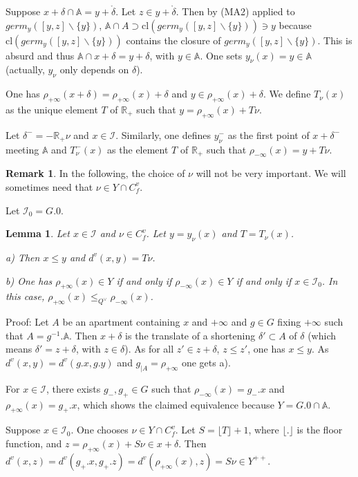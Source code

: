 \documentclass[12pt]{article}
\theoremstyle{plain}
\newtheorem{lemme}[thm]{Lemma}
\theoremstyle{definition}
\newtheorem{rque}[thm]{Remark}
\newcommand{\R}{\mathbb{R}}
\newcommand{\A}{\mathbb{A}}
\newcommand{\I}{\mathcal{I}}
\begin{document}
 Suppose $x+\delta\cap \A=y+\mathring{\delta}$. Let $z\in y+\mathring{\delta}$. Then by (MA2) applied to $germ_y([y,z]\backslash\{y\})$, $\A\cap A\supset \mathrm{cl}(germ_y([y,z]\backslash\{y\}))\ni y$ because $\mathrm{cl}(germ_y([y,z]\backslash\{y\}))$ contains the closure of $germ_y([y,z]\backslash\{y\})$. This is absurd and thus $\A\cap x+\delta=y+\delta$, with $y\in \A$. One sets $y_\nu(x)=y\in\A$ (actually, $y_\nu$ only depends on $\delta$).

One has $\rho_{+\infty}(x+\delta)=\rho_{+\infty}(x)+\delta$ and $y\in \rho_{+\infty}(x)+\delta$. We define $T_\nu(x)$ as the unique element $T$ of $\mathbb{R}_+$ such that $y=\rho_{+\infty}(x)+T\nu$.

Let $\delta^-=-\R_+\nu$ and $x\in \I$. Similarly, one defines $y_\nu^-$ as the first point of $x+\delta^-$ meeting $\A$ and $T^-_\nu(x)$ as the element $T$ of $\R_+$ such that $\rho_{-\infty}(x)=y+T\nu$.


\begin{rque}
In the following, the choice of $\nu$ will not be very important. We will sometimes need that $\nu\in Y\cap C_f^v$.
\end{rque}

Let $\I_0=G.0$.


\begin{lemme}\label{lemme distance vectorielle}
Let $x\in \mathcal{I}$ and $\nu\in C_f^v$. Let $y=y_\nu(x)$ and $T=T_\nu(x)$.

a)  Then $x\leq y$ and $d^v(x,y)=T\nu$.

b) One has $\rho_{+\infty}(x)\in Y$ if and only if $\rho_{-\infty}(x)\in Y$ if and only if $x\in \mathcal I_0$. In this case, $\rho_{+\infty}(x)\leq_{Q^\vee} \rho_{-\infty}(x)$.


\end{lemme}

Proof: Let $A$ be an apartment containing $x$ and $+\infty$ and $g\in G$ fixing $+\infty$ such that $A=g^{-1}.\A$. Then $x+\delta$ is the translate of a shortening $\delta'\subset A$ of $\delta$ (which means $\delta'=z+\delta$, with $z\in \delta$). As for all $z'\in z+\delta$, $z\leq z'$, one has $x\leq y$. As $d^v(x,y)=d^v(g.x,g.y)$ and $g_{|A}=\rho_{+\infty}$ one gets a).

For $x\in\mathcal{I}$, there exists $g_-,g_+\in G$ such that $\rho_{-\infty}(x)=g_-.x$ and $\rho_{+\infty}(x)=g_+.x$, which shows the claimed equivalence because $Y=G.0\cap \mathbb{A}$.

Suppose $x\in \mathcal{I}_0$. One chooses $\nu\in Y\cap C_f^v$. Let $S=\lfloor T\rfloor +1$, where $\lfloor.\rfloor$ is the floor function, and $z=\rho_{+\infty}(x)+S\nu\in x+\delta$. Then $d^v(x,z)=d^v(g_+.x,g_+.z)=d^v(\rho_{+\infty}(x),z)=S\nu\in Y^{++}$.
\end{document}
